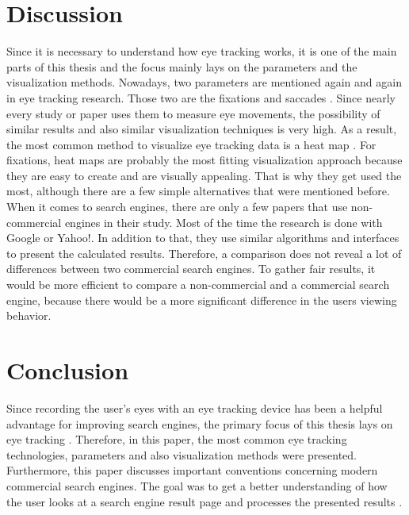 \section{Discussion}
\label{section:Discussion}
Since it is necessary to understand how eye tracking works, it is one of the main parts of this thesis and the focus mainly lays on the parameters and the visualization methods. 
Nowadays, two parameters are mentioned again and again in eye tracking research. Those two are the fixations and saccades \autocite{bruneau2002eyes}. Since nearly every study or paper uses them to measure eye movements, the possibility of similar results and also similar visualization techniques is very high. As a result, the most common method to visualize eye tracking data is a heat map \autocite{bojko2009informative}. For fixations, heat maps are probably the most fitting visualization approach because they are easy to create and are visually appealing. That is why they get used the most, although there are a few simple alternatives that were mentioned before.\\
When it comes to search engines, there are only a few papers that use non-commercial engines in their study. Most of the time the research is done with Google or Yahoo!. In addition to that, they use similar algorithms and interfaces to present the calculated results. Therefore, a comparison does not reveal a lot of differences between two commercial search engines.
To gather fair results, it would be more efficient to compare a non-commercial and a commercial search engine, because there would be a more significant difference in the users viewing behavior.

\section{Conclusion}
\label{section:Conclusion}
Since recording the user's eyes with an eye tracking device has been a helpful advantage for improving search engines, the primary focus of this thesis lays on eye tracking \autocite{liu2015influence}. Therefore, in this paper, the most common eye tracking technologies, parameters and also visualization methods were presented. Furthermore, this paper discusses important conventions concerning modern commercial search engines. The goal was to get a better understanding of how the user looks at a search engine result page and processes the presented results \autocite{biedert2010eyebook}.

